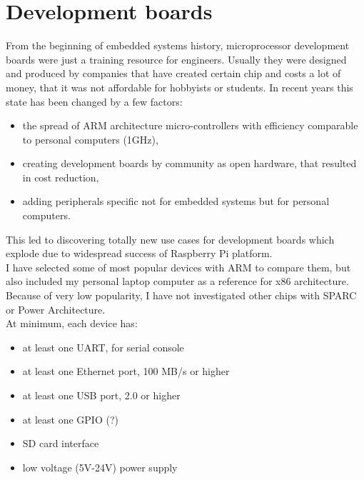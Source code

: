 \documentclass[printmode]{mgr}
\begin{document}
\chapter{Development boards}
\label{section:development-boards}

From the beginning of embedded systems history, microprocessor development boards were just a training resource for engineers.
Usually they were designed and produced by companies that have created certain chip and costs a lot of money, that it was not affordable for hobbyists or students.
In recent years this state has been changed by a few factors:
\begin{itemize}
  \item the spread of ARM architecture micro-controllers with efficiency comparable to personal computers (1GHz),
  \item creating development boards by community as open hardware, that resulted in cost reduction,
  \item adding peripherals specific not for embedded systems but for personal computers.
\end{itemize}
This led to discovering totally new use cases for development boards which explode due to widespread success of Raspberry Pi platform. \\
I have selected some of most popular devices with ARM to compare them, but also included my personal laptop computer as a reference for x86 architecture. Because of very low popularity, I  have not investigated other chips with SPARC or Power Architecture. \\

At minimum, each device has:
\begin{itemize}
  \item at least one UART, for serial console
  \item at least one Ethernet port, 100 MB/s or higher
  \item at least one USB port, 2.0 or higher
  \item at least one GPIO (?)
  \item SD card interface
  \item low voltage (5V-24V) power supply
\end{itemize}
\end{document}
